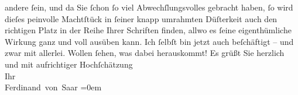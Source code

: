 \begin{ledgroupsized}[t]{13cm}
                  {\pb}andere ſein, und da Sie ſchon ſo viel
               Abwechſlungsvolles gebracht haben, ſo wird dieſes peinvolle Machtſtück in ſeiner
               knapp umrahmten Düſterkeit \introOben{}auch\introOben{} den richtigen Platz in der
               Reihe Ihrer Schriften finden, allwo es ſeine eigenthümliche Wirkung ganz und voll
               ausüben kann.\pend
           \pstart
           Ich ſelbſt bin jetzt auch beſchäftigt – und zwar mit allerlei. Wollen ſehen, was
               dabei herauskommt!\pend
           \pstart
           Es grüßt Sie herzlich und mit aufrichtiger Hochſchätzung{\\[\baselineskip]}Ihr{\\[\baselineskip]}\spacefill\mbox{Ferdinand von Saar}\pend
           \leftskip=0em{}
         
         \endnumbering{}\end{ledgroupsized}  \newcommand{\dateiname}{L00410}\newcommand{\titel}{Ferdinand von Saar an Arthur Schnitzler, 13. 12. 1894}\newcommand{\editorInnen}{Martin Anton Müller und Gerd-Hermann Susen}
      
